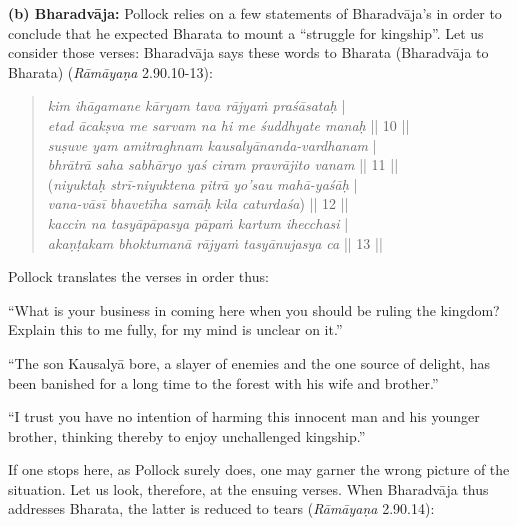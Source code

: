 \noindent
\textbf{(b) Bharadvāja:} Pollock relies on a few statements of Bharadvāja’s in order to conclude that he expected Bharata to mount a “struggle for kingship”. Let us consider those verses: Bharadvāja says these words to Bharata (Bharadvāja to Bharata) ({\sl Rāmāyaṇa} 2.90.10-13):\\[-21pt] 
\begin{quote}
{{\sl kim ihāgamane kāryam tava rājyaṁ praśāsataḥ}}\label{verse28} |\\
{{\sl etad ācakṣva me sarvam na hi me śuddhyate manaḥ}} || 10 ||\\
{\sl suṣuve yam amitraghnam kausalyānanda-vardhanam}\label{verse29} |\\
{\sl bhrātrā saha sabhāryo yaś ciram pravrājito vanam} || 11 ||\\
({\sl niyuktaḥ strī-niyuktena pitrā yo’sau mahā-yaśāḥ}\label{verse30} |\\
{\sl vana-vāsī bhavetīha samāḥ kila caturdaśa}) || 12 ||\\
{\sl kaccin na tasyāpāpasya pāpaṁ kartum ihecchasi}\label{verse31} |\\
{\sl akaṇṭakam bhoktumanā rājyaṁ tasyānujasya ca} || 13 ||
\end{quote}
\vskip -2pt

Pollock translates the verses in order thus:
\vskip -2pt

\begin{myquote}
“What is your business in coming here when you should be ruling the kingdom? Explain this to me fully, for my mind is unclear on it.” 

“The son Kausalyā bore, a slayer of enemies and the one source of delight, has been banished for a long time to the forest with his wife and brother.”			 

“I trust you have no intention of harming this innocent man and his younger brother, thinking thereby to enjoy unchallenged kingship.”
\end{myquote}

If one stops here, as Pollock surely does, one may garner the wrong picture of the situation. Let us look, therefore, at the ensuing verses. When Bharadvāja thus addresses Bharata, the latter is reduced to tears ({\sl Rāmāyaṇa} 2.90.14):
\vskip -10pt

